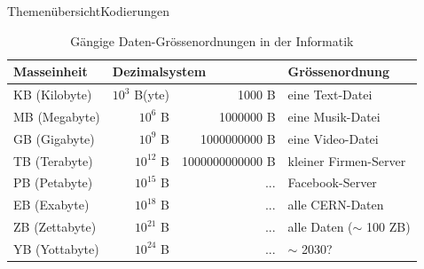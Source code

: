 \begin{frame}{Themenübersicht}{Kodierungen}
    \begin{table}[H]
        \footnotesize
        \centering
        \begin{tabular}{@{}l|rr|l@{}}
            \toprule
            \textbf{Masseinheit} & \multicolumn{2}{l|}{\textbf{Dezimalsystem}} & Grössenordnung                                   \\ \midrule
            KB (Kilobyte)        & $10^3$ B(yte)                               & \num{1000} B             & eine Text-Datei            \\
            MB (Megabyte)        & $10^6$ B                                    & \num{1000000} B         & eine Musik-Datei           \\
            GB (Gigabyte)        & $10^9$ B                                    & \num{1000000000} B     & eine Video-Datei           \\
            TB (Terabyte)        & $10^{12}$ B                                 & \num{1000000000000} B & kleiner Firmen-Server      \\
            PB (Petabyte)        & $10^{15}$ B                                 & ...                 & Facebook-Server            \\
            EB (Exabyte)         & $10^{18}$ B                                 & ...                 & alle CERN-Daten            \\
            ZB (Zettabyte)       & $10^{21}$ B                                 & ...                 & alle Daten ($\sim$ 100 ZB) \\
            YB (Yottabyte)       & $10^{24}$ B                                 & ...                 & $\sim$ 2030?               \\ \bottomrule
        \end{tabular}
        \caption*{Gängige Daten-Grössenordnungen in der Informatik}
    \end{table}
\end{frame}


